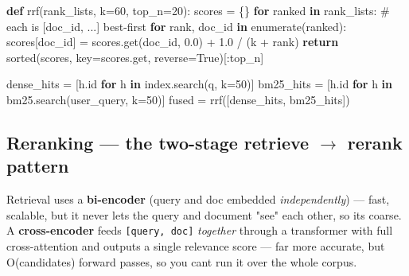 \documentclass[11pt]{article}
\newenvironment{Shaded}{\begin{snugshade}}{\end{snugshade}}
\newcommand{\BuiltInTok}[1]{\textcolor[rgb]{0.50,0.55,0.55}{#1}}
\newcommand{\CommentTok}[1]{\textcolor[rgb]{0.48,0.49,0.49}{#1}}
\newcommand{\ControlFlowTok}[1]{\textcolor[rgb]{0.99,0.74,0.29}{\textbf{#1}}}
\newcommand{\DecValTok}[1]{\textcolor[rgb]{0.96,0.45,0.00}{#1}}
\newcommand{\FloatTok}[1]{\textcolor[rgb]{0.96,0.45,0.00}{#1}}
\newcommand{\KeywordTok}[1]{\textcolor[rgb]{0.81,0.81,0.76}{\textbf{#1}}}
\newcommand{\NormalTok}[1]{\textcolor[rgb]{0.81,0.81,0.76}{#1}}
\newcommand{\OperatorTok}[1]{\textcolor[rgb]{0.81,0.81,0.76}{#1}}
\newcommand{\VariableTok}[1]{\textcolor[rgb]{0.15,0.68,0.68}{#1}}
\begin{document}

\begin{Shaded}
\begin{Highlighting}[]
\KeywordTok{def}\NormalTok{ rrf(rank\_lists, k}\OperatorTok{=}\DecValTok{60}\NormalTok{, top\_n}\OperatorTok{=}\DecValTok{20}\NormalTok{):}
\NormalTok{    scores }\OperatorTok{=}\NormalTok{ \{\}}
    \ControlFlowTok{for}\NormalTok{ ranked }\KeywordTok{in}\NormalTok{ rank\_lists:                       }\CommentTok{\# each is [doc\_id, ...] best{-}first}
        \ControlFlowTok{for}\NormalTok{ rank, doc\_id }\KeywordTok{in} \BuiltInTok{enumerate}\NormalTok{(ranked):}
\NormalTok{            scores[doc\_id] }\OperatorTok{=}\NormalTok{ scores.get(doc\_id, }\FloatTok{0.0}\NormalTok{) }\OperatorTok{+} \FloatTok{1.0} \OperatorTok{/}\NormalTok{ (k }\OperatorTok{+}\NormalTok{ rank)}
    \ControlFlowTok{return} \BuiltInTok{sorted}\NormalTok{(scores, key}\OperatorTok{=}\NormalTok{scores.get, reverse}\OperatorTok{=}\VariableTok{True}\NormalTok{)[:top\_n]}

\NormalTok{dense\_hits }\OperatorTok{=}\NormalTok{ [h.}\BuiltInTok{id} \ControlFlowTok{for}\NormalTok{ h }\KeywordTok{in}\NormalTok{ index.search(q, k}\OperatorTok{=}\DecValTok{50}\NormalTok{)]}
\NormalTok{bm25\_hits  }\OperatorTok{=}\NormalTok{ [h.}\BuiltInTok{id} \ControlFlowTok{for}\NormalTok{ h }\KeywordTok{in}\NormalTok{ bm25.search(user\_query, k}\OperatorTok{=}\DecValTok{50}\NormalTok{)]}
\NormalTok{fused }\OperatorTok{=}\NormalTok{ rrf([dense\_hits, bm25\_hits])}
\end{Highlighting}
\end{Shaded}

\subsection{\texorpdfstring{Reranking --- the two-stage retrieve \(\rightarrow\) rerank pattern}{Reranking --- the two-stage retrieve \textbackslash rightarrow rerank pattern}}\label{reranking--the-two-stage-retrieve-rightarrow-rerank-pattern}

Retrieval uses a \textbf{bi-encoder} (query and doc embedded \emph{independently}) --- fast, scalable, but it never lets the query and document "see" each other, so it\textquotesingle s coarse. A \textbf{cross-encoder} feeds \texttt{{[}query,\ doc{]}} \emph{together} through a transformer with full cross-attention and outputs a single relevance score --- far more accurate, but O(candidates) forward passes, so you can\textquotesingle t run it over the whole corpus.
\end{document}
